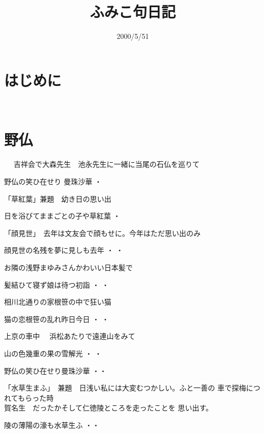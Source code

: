 \documentclass[b5paper]{tbook}
\begin{document}
\title{ふみこ句日記}
\date{2000/5/51}
\maketitle

\chapter*{はじめに}


　
\chapter{野仏}
　
吉祥会で大森先生　池永先生に一緒に当尾の石仏を巡りて　



\begin{shiika}
野仏の笑ひ在せり 曼珠沙華\hfill {  ・  }
\end{shiika}
\vspace{0.6cm}
「草紅葉」兼題　幼き日の思い出　
\begin{shiika}
 日を浴びてままごとの子や草紅葉\hfill {  ・  }
\end{shiika}
\vspace{0.6cm}
「顔見世」　去年は文友会で顔もせに。今年はただ思い出のみ
\begin{shiika}
顔見世の名残を夢に見しも去年\hfill {  ・  ・}
\end{shiika}
\vspace{0.6cm}
お隣の浅野まゆみさんかわいい日本髪で
\begin{shiika}
髪結ひて寝ず娘は待つ初詣\hfill {  ・  ・}
\end{shiika}
\vspace{0.6cm}
相川北通りの家根笹の中で狂い猫
\begin{shiika}
猫の恋根笹の乱れ昨日今日\hfill {  ・  ・}
\end{shiika}
\vspace{0.6cm}
上京の車中　
浜松あたりで遠連山をみて
\begin{shiika}
山の色幾重の果の雪解光\hfill {  ・  ・ }	
\end{shiika}


\vspace{0.6cm}
\begin{shiika}野仏の笑ひ在せり曼珠沙華
\hfill{・・}\end{shiika}
\vspace{0.6cm}
「水草生まふ」　兼題　日浅い私には大変むつかしい。ふと一善の
車で探梅につれてもらった時\\賀名生　だったかそして仁徳陵ところを走ったことを
思い出す。
\begin{shiika}陵の薄陽の濠も水草生ふ
\hfill{・・}\end{shiika}
\end{document}

